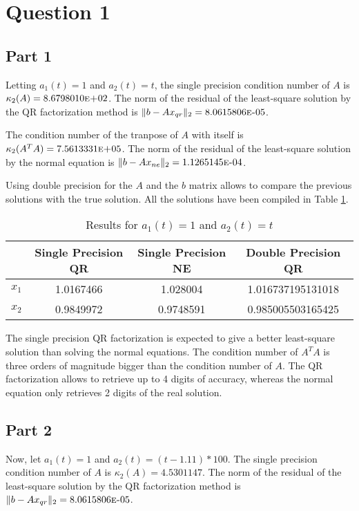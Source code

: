 \documentclass[letterpaper,12pt,]{article}
\begin{document}


\section*{Question 1}

\subsection*{Part 1}
Letting $a_{1}(t) = 1$ and $a_{2}(t) = t$, the single precision condition number of $A$ is $\kappa_2(A)=8.6798010\text{\sc{e}+}02$. The norm of the residual of the least-square solution by the QR factorization method is $\|b-Ax_{qr}\|_2 = 8.0615806\text{\sc{e}-}05$.

The condition number of the tranpose of $A$ with itself is $\kappa_{2}(A^{T}A) = 7.5613331\text{\sc{e}+}05$. The norm of the residual of the least-square solution by the normal equation is $\|b-Ax_{ne}\|_2 = 1.1265145\text{\sc{e}-}04$.

Using double precision for the $A$ and the $b$ matrix allows to compare the previous solutions with the true solution. All the solutions have been compiled in Table \ref{tab:r1}.

\begin{table}[h]
\centering
\begin{tabular}{cccc} \toprule
    {} & {Single Precision QR} & {Single Precision NE} & {Double Precision QR}\\ \midrule
    $x_1$ &	1.0167466 & 1.028004 & 1.016737195131018\\
    $x_2$ &	0.9849972 & 0.9748591 & 0.985005503165425\\
\bottomrule
\end{tabular}
\caption{Results for $a_{1}(t) = 1$ and $a_{2}(t) = t$}
\label{tab:r1}
\end{table}

The single precision QR factorization is expected to give a better least-square solution than solving the normal equations. The condition number of $A^TA$ is three orders of magnitude bigger than the condition number of $A$. The QR factorization allows to retrieve up to 4 digits of accuracy, whereas the normal equation only retrieves 2 digits of the real solution.

\subsection*{Part 2}

Now, let $a_{1}(t) = 1$ and $a_{2}(t) = (t-1.11) \ast 100$. The single precision condition number of $A$ is $\kappa_2(A)=4.5301147$. The norm of the residual of the least-square solution by the QR factorization method is $\|b-Ax_{qr}\|_2 = 8.0615806\text{\sc{e}-}05$.
\end{document}
